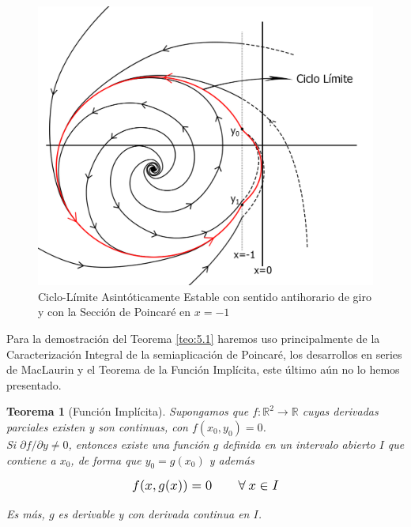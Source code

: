 \documentclass[12pt,a4paper]{report} %
\newtheorem{theorem}{Teorema}[chapter]
\begin{document}
	\newpage
	
	\begin{figure}[h]
		\centering
		\includegraphics[width=1.1\textwidth,center]{ciclolimite3.jpg}
		\caption{Ciclo-Límite Asintóticamente Estable con sentido antihorario de giro y con la Sección de Poincaré en $x=-1$}
		\label{fig:ciclolimite3}
	\end{figure}\smallskip
	
	\newpage
	
	Para la demostración del Teorema \ref{teo:5.1} haremos uso principalmente de la Caracterización Integral de la semiaplicación de Poincaré, los desarrollos en series de MacLaurin y el Teorema de la Función Implícita, este último aún no lo hemos presentado.
	
	\begin{theorem}[Función Implícita]
		\label{teo.fi}
		Supongamos que $f:\mathbb{R}^2 \longrightarrow\mathbb{R}$ cuyas derivadas parciales existen y son continuas, con $f(x_0,y_0)=0$.\\[0.2cm]
		Si $\partial f / \partial y\neq0$, entonces existe una función $g$ definida en un intervalo abierto $I$ que contiene a $x_0$, de forma que $y_0=g(x_0)$ y además
		
		\begin{equation*}
			\scalebox{1.2}{$\displaystyle
			f(x,g(x))=0 \qquad \forall \: x\in I
			$}
		\end{equation*}\smallskip
		
		\noindent Es más, $g$ es derivable y con derivada continua en $I$.
		
	\end{theorem}
	
\end{document}
